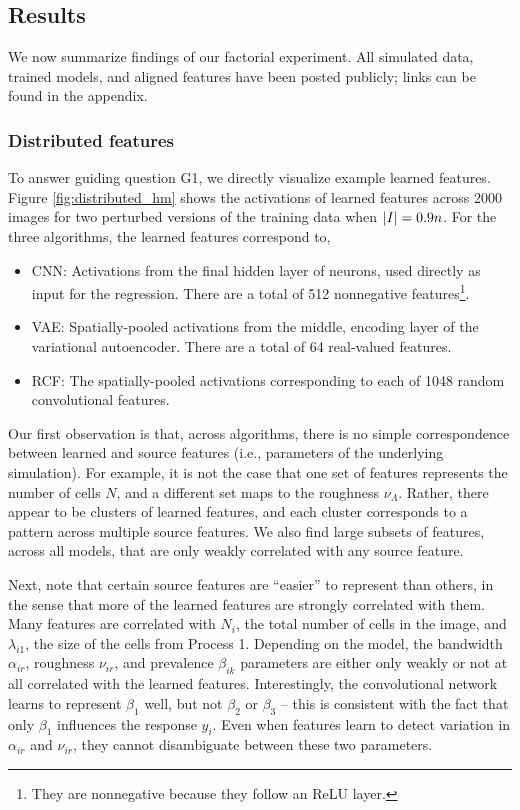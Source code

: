 \subsection{Results}

We now summarize findings of our factorial experiment. All simulated data,
trained models, and aligned features have been posted publicly; links can be
found in the appendix.

\subsubsection{Distributed features}

To answer guiding question G1, we directly visualize example learned features. Figure
\ref{fig:distributed_hm} shows the activations of learned features across 2000
images for two perturbed versions of the training data when $\left|I\right| = 0.9n$.
For the three algorithms, the learned features correspond to,

\begin{itemize}
\item CNN: Activations from the final hidden layer of neurons, used directly as input
  for the regression. There are a total of 512 nonnegative
  features\footnote{They are nonnegative because they follow an ReLU layer.}.
\item VAE: Spatially-pooled activations from the middle, encoding layer of the
  variational autoencoder. There are a total of 64 real-valued features.
\item RCF: The spatially-pooled activations corresponding to each of 1048 random
  convolutional features.
\end{itemize}

Our first observation is that, across algorithms, there is no simple
correspondence between learned and source features (i.e., parameters of the
underlying simulation). For example, it is not the case that one set of features
represents the number of cells $N$, and a different set maps to the roughness
$\nu_{\Lambda}$. Rather, there appear to be clusters of learned features, and
each cluster corresponds to a pattern across multiple source features. We also
find large subsets of features, across all models, that are only weakly
correlated with any source feature.

Next, note that certain source features are ``easier'' to represent than others,
in the sense that more of the learned features are strongly correlated with
them. Many features are correlated with $N_{i}$, the total number of cells in
the image, and $\lambda_{i1}$, the size of the cells from Process 1. Depending
on the model, the bandwidth $\alpha_{ir}$, roughness $\nu_{ir}$, and prevalence
$\beta_{ik}$ parameters are either only weakly or not at all correlated with the
learned features. Interestingly, the convolutional network learns to represent
$\beta_{1}$ well, but not $\beta_{2}$ or $\beta_{3}$ -- this is consistent with
the fact that only $\beta_{1}$ influences the response $y_{i}$. Even when
features learn to detect variation in $\alpha_{ir}$ and $\nu_{ir}$, they cannot
disambiguate between these two parameters.

